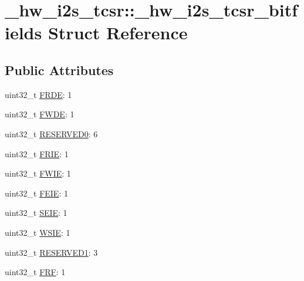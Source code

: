 \hypertarget{struct__hw__i2s__tcsr_1_1__hw__i2s__tcsr__bitfields}{}\section{\+\_\+hw\+\_\+i2s\+\_\+tcsr\+:\+:\+\_\+hw\+\_\+i2s\+\_\+tcsr\+\_\+bitfields Struct Reference}
\label{struct__hw__i2s__tcsr_1_1__hw__i2s__tcsr__bitfields}
\subsection*{Public Attributes}
\begin{DoxyCompactItemize}
\item 
uint32\+\_\+t \hyperlink{struct__hw__i2s__tcsr_1_1__hw__i2s__tcsr__bitfields_a4997be3a7966cdfa7cfd0039bab7a0f2}{F\+R\+DE}\+: 1
\item 
uint32\+\_\+t \hyperlink{struct__hw__i2s__tcsr_1_1__hw__i2s__tcsr__bitfields_a0886a041d82f99a9d5dbbd1315b2f704}{F\+W\+DE}\+: 1
\item 
uint32\+\_\+t \hyperlink{struct__hw__i2s__tcsr_1_1__hw__i2s__tcsr__bitfields_a17edfdf8ca111fdec897ad04799b7d86}{R\+E\+S\+E\+R\+V\+E\+D0}\+: 6
\item 
uint32\+\_\+t \hyperlink{struct__hw__i2s__tcsr_1_1__hw__i2s__tcsr__bitfields_ae463856e53ff5658749d2d827f647794}{F\+R\+IE}\+: 1
\item 
uint32\+\_\+t \hyperlink{struct__hw__i2s__tcsr_1_1__hw__i2s__tcsr__bitfields_af8c88f4be6520b974909f18f614ceda8}{F\+W\+IE}\+: 1
\item 
uint32\+\_\+t \hyperlink{struct__hw__i2s__tcsr_1_1__hw__i2s__tcsr__bitfields_af80db831fa27069f66a8082edfeeb882}{F\+E\+IE}\+: 1
\item 
uint32\+\_\+t \hyperlink{struct__hw__i2s__tcsr_1_1__hw__i2s__tcsr__bitfields_a55dc085e8793d4ac01b499506ab36ef0}{S\+E\+IE}\+: 1
\item 
uint32\+\_\+t \hyperlink{struct__hw__i2s__tcsr_1_1__hw__i2s__tcsr__bitfields_a281d5798d254b5524524832ee20dbd12}{W\+S\+IE}\+: 1
\item 
uint32\+\_\+t \hyperlink{struct__hw__i2s__tcsr_1_1__hw__i2s__tcsr__bitfields_a031dd200a10adc0de2f83041984fd2f4}{R\+E\+S\+E\+R\+V\+E\+D1}\+: 3
\item 
uint32\+\_\+t \hyperlink{struct__hw__i2s__tcsr_1_1__hw__i2s__tcsr__bitfields_a143aa3261d591994b3bcc83b18b54df1}{F\+RF}\+: 1
\item 

\end{DoxyCompactItemize}
